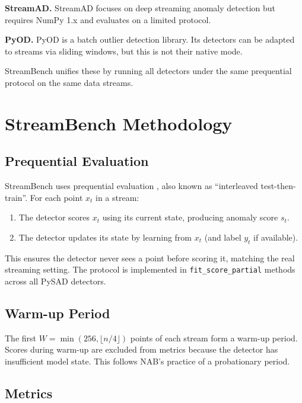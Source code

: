 \documentclass[11pt,a4paper]{article}
\begin{document}
\textbf{StreamAD.} StreamAD \citep{streamad2023} focuses on deep streaming anomaly detection but requires NumPy 1.x and evaluates on a limited protocol.

\textbf{PyOD.} PyOD \citep{zhao2019pyod} is a batch outlier detection library. Its detectors can be adapted to streams via sliding windows, but this is not their native mode.

StreamBench unifies these by running all detectors under the same prequential protocol on the same data streams.

\section{StreamBench Methodology}
\label{sec:methodology}

\subsection{Prequential Evaluation}
\label{sec:prequential}

StreamBench uses prequential evaluation \citep{dawid1984present}, also known as ``interleaved test-then-train''. For each point $x_t$ in a stream:
\begin{enumerate}
    \item The detector scores $x_t$ using its current state, producing anomaly score $s_t$.
    \item The detector updates its state by learning from $x_t$ (and label $y_t$ if available).
\end{enumerate}

This ensures the detector never sees a point before scoring it, matching the real streaming setting. The protocol is implemented in \texttt{fit\_score\_partial} methods across all PySAD detectors.

\subsection{Warm-up Period}
\label{sec:warmup}

The first $W = \min(256, \lfloor n/4 \rfloor)$ points of each stream form a warm-up period. Scores during warm-up are excluded from metrics because the detector has insufficient model state. This follows NAB's practice of a probationary period.

\subsection{Metrics}
\label{sec:metrics}
\end{document}
